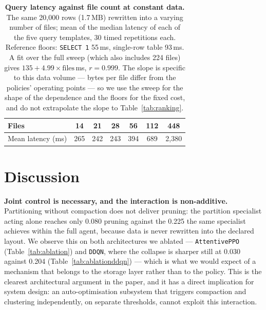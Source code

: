 \documentclass[fleqn,10pt]{wlscirep}
\newcommand{\attentive}{\texttt{AttentivePPO}}
\newcommand{\ddqn}{\texttt{DDQN}}
\begin{document}
\begin{table}[!htbp]
\centering
\begin{tabular}{lcccccc}
\toprule
\textbf{Files} & 14 & 21 & 28 & 56 & 112 & 448 \\
\midrule
Mean latency (ms) & 265 & 242 & 243 & 394 & 689 & 2{,}380 \\
\bottomrule
\end{tabular}
\caption{\label{tab:latencyfloor}\textbf{Query latency against file count at
  constant data.}
  The same 20{,}000 rows (1.7\,MB) rewritten into a varying number of
  files; mean of the median latency of each of the five query templates,
  30 timed repetitions each. Reference floors: \texttt{SELECT 1} 55\,ms,
  single-row table 93\,ms. A fit over the full sweep (which also includes
  224 files) gives $135 + 4.99\times\text{files}$\,ms, $r = 0.999$. The
  slope is specific to this data volume --- bytes per file differ from
  the policies' operating points --- so we use the sweep for the shape of
  the dependence and the floors for the fixed cost, and do not
  extrapolate the slope to Table~\ref{tab:ranking}.}
\end{table}

\FloatBarrier

\section*{Discussion}
\label{sec:discussion}

\textbf{Joint control is necessary, and the interaction is
non-additive.}
Partitioning without compaction does not deliver pruning: the partition
specialist acting alone reaches only 0.080 pruning against the 0.225 the
same specialist achieves within the full agent, because data is never
rewritten into the declared layout. We observe this on both architectures
we ablated --- \attentive{} (Table~\ref{tab:ablation}) and \ddqn{}, where
the collapse is sharper still at 0.030 against 0.204
(Table~\ref{tab:ablationddqn}) --- which is what we would expect of a
mechanism that belongs to the storage layer rather than to the policy.
This is the clearest architectural argument in the
paper, and it has a direct implication for system design: an
auto-optimisation subsystem that triggers compaction and clustering
independently, on separate thresholds, cannot exploit this interaction.
\end{document}
